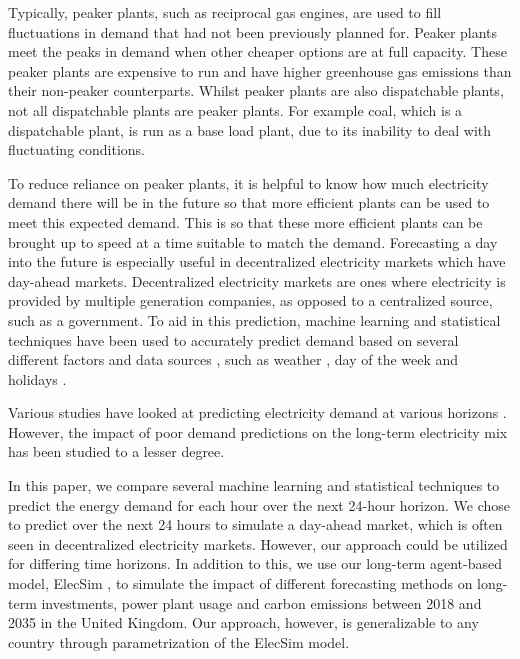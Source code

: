 \documentclass[final,3p,times,twocolumn,numbers]{elsarticle}
\begin{document}
Typically, peaker plants, such as reciprocal gas engines, are used to fill fluctuations in demand that had not been previously planned for. Peaker plants meet the peaks in demand when other cheaper options are at full capacity. These peaker plants are expensive to run and have higher greenhouse gas emissions than their non-peaker counterparts. Whilst peaker plants are also dispatchable plants, not all dispatchable plants are peaker plants. For example coal, which is a dispatchable plant, is run as a base load plant, due to its inability to deal with fluctuating conditions.

To reduce reliance on peaker plants, it is helpful to know how much electricity demand there will be in the future so that more efficient plants can be used to meet this expected demand. This is so that these more efficient plants can be brought up to speed at a time suitable to match the demand. Forecasting a day into the future is especially useful in decentralized electricity markets which have day-ahead markets. Decentralized electricity markets are ones where electricity is provided by multiple generation companies, as opposed to a centralized source, such as a government. To aid in this prediction, machine learning and statistical techniques have been used to accurately predict demand based on several different factors and data sources \cite{Kell2018a}, such as weather \cite{Hong2014}, day of the week \cite{Al-Musaylh2018} and holidays \cite{Vrablecova2017}. 




Various studies have looked at predicting electricity demand at various horizons \cite{Singh2012,Huang2003,Andersen2013}. However, the impact of poor demand predictions on the long-term electricity mix has been studied to a lesser degree.

In this paper, we compare several machine learning and statistical techniques to predict the energy demand for each hour over the next 24-hour horizon. We chose to predict over the next 24 hours to simulate a day-ahead market, which is often seen in decentralized electricity markets. However, our approach could be utilized for differing time horizons. In addition to this, we use our long-term agent-based model, ElecSim \cite{Kell, Kell2020}, to simulate the impact of different forecasting methods on long-term investments, power plant usage and carbon emissions between 2018 and 2035 in the United Kingdom. Our approach, however, is generalizable to any country through parametrization of the ElecSim model.
\end{document}
